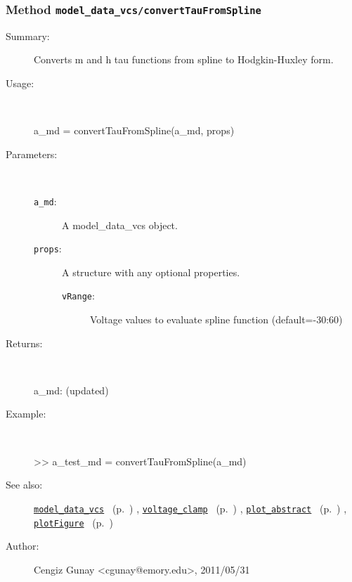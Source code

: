 \subsubsection[Method \texttt{convertTauFromSpline}]{Method \texttt{model\_data\_vcs/convertTauFromSpline}}%
%
\label{ref_model_data_vcs__convertTauFromSpline}%
\hypertarget{ref_model_data_vcs__convertTauFromSpline}{}%
\begin{description}
\item[Summary:]Converts m and h tau functions from spline to Hodgkin-Huxley form.
%
\item[Usage:]~%
\begin{lyxcode}%
a\_md = convertTauFromSpline(a\_md, props)
%
\end{lyxcode}%
%
%
\item[Parameters:]~
\begin{description}%
\item[\texttt{a\_md}:]
 A model\_data\_vcs object.
\item[\texttt{props}:]
 A structure with any optional properties.
\begin{description}%
\item[\texttt{vRange}:]
 Voltage values to evaluate spline function (default=-30:60)
\end{description}%
\end{description}%
%
\item[Returns:
]~

   a\_md: (updated)
%
\item[Example:]~
\begin{lyxcode} >> a\_test\_md = convertTauFromSpline(a\_md)
\\%
\end{lyxcode}
%
\item[See also:]%
\hyperlink{ref_model_data_vcs}{\texttt{model\_data\_vcs}}%
\ (p.~\pageref{ref_model_data_vcs})%
%
, \hyperlink{ref_voltage_clamp}{\texttt{voltage\_clamp}}%
\ (p.~\pageref{ref_voltage_clamp})%
%
, \hyperlink{ref_plot_abstract}{\texttt{plot\_abstract}}%
\ (p.~\pageref{ref_plot_abstract})%
%
, \hyperlink{ref_plotFigure}{\texttt{plotFigure}}%
\ (p.~\pageref{ref_plotFigure})%
%
%
\item[Author:]%
Cengiz Gunay <cgunay@emory.edu>, 2011/05/31
%
\end{description}
\methodline%
